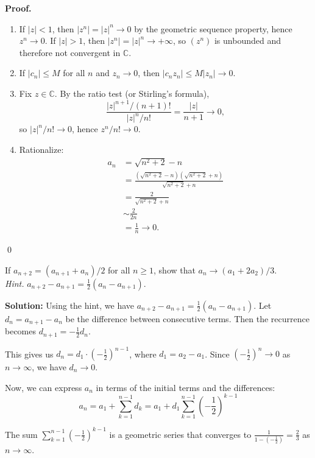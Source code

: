 \noindent\textbf{Proof.}
\begin{enumerate}[label=(\alph*)]
\item If $|z|<1$, then $|z^n|=|z|^n\to 0$ by the geometric sequence property, hence $z^n\to 0$. If $|z|>1$, then $|z^n|=|z|^n\to +\infty$, so $(z^n)$ is unbounded and therefore not convergent in $\mathbb{C}$.
\item If $|c_n|\le M$ for all $n$ and $z_n\to 0$, then $|c_n z_n|\le M|z_n|\to 0$.
\item Fix $z\in\mathbb{C}$. By the ratio test (or Stirling's formula),
\[
\frac{|z|^{n+1}/(n+1)!}{|z|^n/n!}=\frac{|z|}{n+1}\to 0,
\]
so $|z|^n/n!\to 0$, hence $z^n/n!\to 0$.
\item Rationalize:
\begin{align*}
a_n&=\sqrt{n^2+2}-n\\
&=\frac{(\sqrt{n^2+2}-n)(\sqrt{n^2+2}+n)}{\sqrt{n^2+2}+n}\\
&=\frac{2}{\sqrt{n^2+2}+n}\\
&\sim \frac{2}{2n}\\
&=\frac{1}{n}\to 0.
\end{align*}
\end{enumerate}\qed
\medskip



\begin{problembox}
If $a_{n+2} = (a_{n+1} + a_n)/2$ for all $n \geq 1$, show that $a_n \to (a_1 + 2a_2)/3$. \\
\textit{Hint.} $a_{n+2} - a_{n+1} = \frac{1}{2}(a_n - a_{n+1})$.
\end{problembox}

\noindent\textbf{Solution:}
Using the hint, we have $a_{n+2} - a_{n+1} = \frac{1}{2}(a_n - a_{n+1})$. Let $d_n = a_{n+1} - a_n$ be the difference between consecutive terms. Then the recurrence becomes $d_{n+1} = -\frac{1}{2}d_n$.

This gives us $d_n = d_1 \cdot \left(-\frac{1}{2}\right)^{n-1}$, where $d_1 = a_2 - a_1$. Since $\left(-\frac{1}{2}\right)^n \to 0$ as $n \to \infty$, we have $d_n \to 0$.

Now, we can express $a_n$ in terms of the initial terms and the differences:
\[
a_n = a_1 + \sum_{k=1}^{n-1} d_k = a_1 + d_1 \sum_{k=1}^{n-1} \left(-\frac{1}{2}\right)^{k-1}
\]

The sum $\sum_{k=1}^{n-1} \left(-\frac{1}{2}\right)^{k-1}$ is a geometric series that converges to $\frac{1}{1 - \left(-\frac{1}{2}\right)} = \frac{2}{3}$ as $n \to \infty$.


